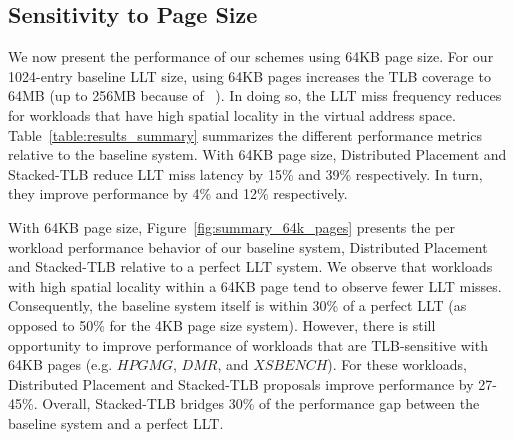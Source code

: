 \subsection{Sensitivity to Page Size}

\noindent We now present the performance of our schemes using 64KB
page size. For our 1024-entry baseline LLT size, using 64KB pages
increases the TLB coverage to 64MB (up to 256MB because of
~\cite{COLT}). In doing so, the LLT miss frequency reduces for
workloads that have high spatial locality in the virtual address
space. Table~\ref{table:results_summary} summarizes the different
performance metrics relative to the baseline system. With 64KB page
size, Distributed Placement and Stacked-TLB reduce LLT miss latency by
15\% and 39\% respectively. In turn, they improve performance by 4\%
and 12\% respectively.

With 64KB page size, Figure~\ref{fig:summary_64k_pages} presents the
per workload performance behavior of our baseline system, Distributed
Placement and Stacked-TLB relative to a perfect LLT system. We observe
that workloads with high spatial locality within a 64KB page tend to
observe fewer LLT misses. Consequently, the baseline system itself is
within 30\% of a perfect LLT (as opposed to 50\% for the 4KB page size
system). However, there is still opportunity to improve performance of
workloads that are TLB-sensitive with 64KB pages (e.g. $HPGMG$, $DMR$,
and $XSBENCH$). For these workloads, Distributed Placement and
Stacked-TLB proposals improve performance by 27-45\%. Overall,
Stacked-TLB bridges 30\% of the performance gap between the baseline
system and a perfect LLT.


% 
% 


